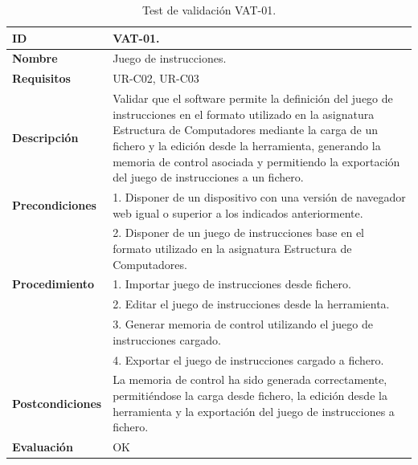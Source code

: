 \begin{center}
\begin{table}[htb]
\centering
\caption{Test de validación VAT-01.}
\begin{tabular}{@{}p{2.5cm} p{9cm}@{}} 
\toprule
\textbf{ID} 					& VAT-01. \\
\midrule
\textbf{Nombre} 				& Juego de instrucciones. \\
\midrule
\textbf{Requisitos} 		& UR-C02, UR-C03 \\
\midrule
\textbf{Descripción} 		& Validar que el software permite la definición del juego de instrucciones en el formato utilizado en la asignatura Estructura de Computadores mediante la carga de un fichero y la edición desde la herramienta, generando la memoria de control asociada y permitiendo la exportación del juego de instrucciones a un fichero. \\
\midrule
\textbf{Precondiciones}		& 1. Disponer de un dispositivo con una versión de navegador web igual o superior a los indicados anteriormente. \\
											& 2. Disponer de un juego de instrucciones base en el formato utilizado en la asignatura Estructura de Computadores. \\
\midrule
\textbf{Procedimiento}		& 1. Importar juego de instrucciones desde fichero.\\
											& 2. Editar el juego de instrucciones desde la herramienta.\\
											& 3. Generar memoria de control utilizando el juego de instrucciones cargado.\\
											& 4. Exportar el juego de instrucciones cargado a fichero. \\
\midrule
\textbf{Postcondiciones} 		&  La memoria de control ha sido generada correctamente, permitiéndose la carga desde fichero, la edición desde la herramienta y la exportación del juego de instrucciones a fichero.\\
\midrule
\textbf{Evaluación} 			& OK \\
\bottomrule
\end{tabular}
\label{tab:vat-01}
\end{table}
\end{center}


